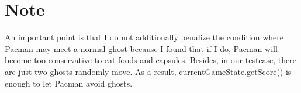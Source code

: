 \documentclass[12pt, a4paper]{article}
\begin{document}
\section*{Note}
  An important point is that I do not additionally penalize the condition where Pacman may meet a
  normal ghost because I found that if I do, Pacman will become too conservative to eat foods and
  capsules. Besides, in our testcase, there are just two ghosts randomly move. As a result,
  currentGameState.getScore() is enough to let Pacman avoid ghosts.
\end{document}
